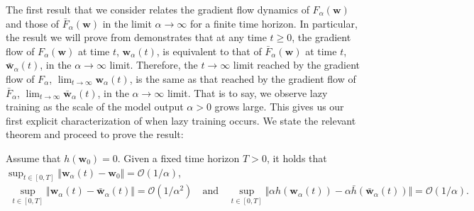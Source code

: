 \documentclass{article}
\newenvironment{manualtheorem}[1]{%
  \renewcommand\themanualtheoreminner{#1}%
  \manualtheoreminner
}{\endmanualtheoreminner}
\begin{document}
The first result that we consider relates the gradient flow dynamics of $F_{\alpha}(\boldsymbol{w})$ and those of $\bar{F}_{\alpha}(\boldsymbol{w})$ in the limit $\alpha \rightarrow \infty$ for a finite time horizon. In particular, the result we will prove from \cite{chizat2018lazy} demonstrates that at any time $t \geq 0$, the gradient flow of $F_{\alpha}(\boldsymbol{w})$ at time $t$, $\boldsymbol{w}_{\alpha}(t)$, is equivalent to that of $\bar{F}_{\alpha}(\boldsymbol{w})$ at time $t$, $\boldsymbol{\bar{w}}_{\alpha}(t)$, in the  $\alpha \rightarrow \infty$ limit. Therefore, the $t \rightarrow \infty$ limit reached by the gradient flow of $F_{\alpha}$, $\lim_{t \to \infty} \boldsymbol{w}_{\alpha}(t)$, is the same as that reached by the gradient flow of $\bar{F}_{\alpha}$, $\lim_{t \to \infty} \boldsymbol{\bar{w}}_{\alpha}(t)$, in the $\alpha \rightarrow \infty$ limit. That is to say, we observe lazy training as the scale of the model output $\alpha > 0$ grows large. This gives us our first explicit characterization of when lazy training occurs. We state the relevant theorem and proceed to prove the result:

\begin{manualtheorem}{2.2}[from \cite{chizat2018lazy}]\label{finitehorizon}
Assume that $h(\boldsymbol{w}_0) = 0$. Given a fixed time horizon $T > 0$, it holds that $\sup_{t \in [0, T]} \Vert \boldsymbol{w}_{\alpha}(t) - \boldsymbol{w}_0 \Vert = \mathcal{O}(1/\alpha)$,
\begin{align*}
    \sup_{t \in [0, T]} \Vert \boldsymbol{w}_{\alpha}(t) - \boldsymbol{\bar{w}}_{\alpha}(t) \Vert = \mathcal{O}(1/\alpha^2) \quad \text{and} \quad \sup_{t \in [0, T]} \Vert \alpha h(\boldsymbol{w}_{\alpha}(t)) - \alpha \bar{h}(\boldsymbol{\bar{w}}_{\alpha}(t)) \Vert = \mathcal{O}(1/\alpha).
\end{align*}
\end{manualtheorem}
\end{document}
